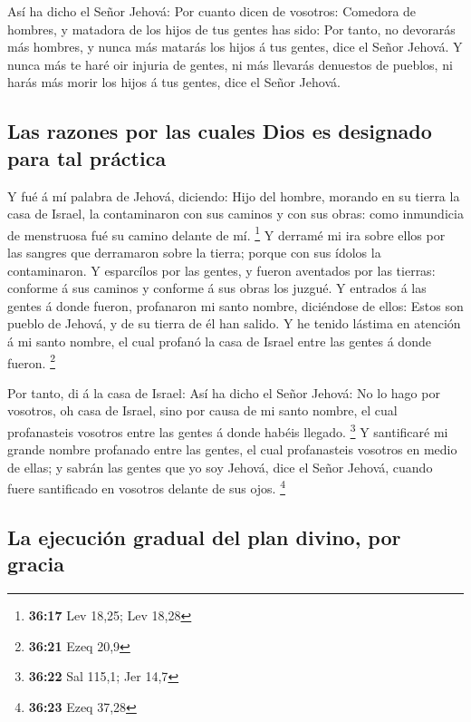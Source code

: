  Así ha dicho el Señor Jehová: Por cuanto dicen de
vosotros: Comedora de hombres, y matadora de los hijos de tus gentes has
sido:  Por tanto, no devorarás más hombres, y nunca más
matarás los hijos á tus gentes, dice el Señor Jehová.  Y
nunca más te haré oir injuria de gentes, ni más llevarás denuestos de
pueblos, ni harás más morir los hijos á tus gentes, dice el Señor
Jehová.

\hypertarget{las-razones-por-las-cuales-dios-es-designado-para-tal-pruxe1ctica}{%
\subsection{Las razones por las cuales Dios es designado para tal
práctica}\label{las-razones-por-las-cuales-dios-es-designado-para-tal-pruxe1ctica}}

 Y fué á mí palabra de Jehová, diciendo: 
Hijo del hombre, morando en su tierra la casa de Israel, la contaminaron
con sus caminos y con sus obras: como inmundicia de menstruosa fué su
camino delante de mí. \footnote{\textbf{36:17} Lev 18,25; Lev 18,28}
 Y derramé mi ira sobre ellos por las sangres que
derramaron sobre la tierra; porque con sus ídolos la contaminaron.
 Y esparcílos por las gentes, y fueron aventados por las
tierras: conforme á sus caminos y conforme á sus obras los juzgué.
 Y entrados á las gentes á donde fueron, profanaron mi
santo nombre, diciéndose de ellos: Estos son pueblo de Jehová, y de su
tierra de él han salido.  Y he tenido lástima en atención
á mi santo nombre, el cual profanó la casa de Israel entre las gentes á
donde fueron. \footnote{\textbf{36:21} Ezeq 20,9}

 Por tanto, di á la casa de Israel: Así ha dicho el Señor
Jehová: No lo hago por vosotros, oh casa de Israel, sino por causa de mi
santo nombre, el cual profanasteis vosotros entre las gentes á donde
habéis llegado. \footnote{\textbf{36:22} Sal 115,1; Jer 14,7}
 Y santificaré mi grande nombre profanado entre las
gentes, el cual profanasteis vosotros en medio de ellas; y sabrán las
gentes que yo soy Jehová, dice el Señor Jehová, cuando fuere santificado
en vosotros delante de sus ojos. \footnote{\textbf{36:23} Ezeq 37,28}

\hypertarget{la-ejecuciuxf3n-gradual-del-plan-divino-por-gracia}{%
\subsection{La ejecución gradual del plan divino, por
gracia}\label{la-ejecuciuxf3n-gradual-del-plan-divino-por-gracia}}

